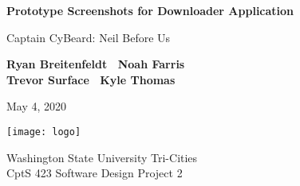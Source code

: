 \begin{titlepage}
    \begin{center}
        \vspace*{1cm}

        \Huge
        \textbf{Prototype Screenshots for Downloader Application}

        \vspace{.5cm}
        \LARGE
        Captain CyBeard: Neil Before Us

        \vspace{1cm}

        \textbf{Ryan Breitenfeldt \textbar\ Noah Farris\\ Trevor Surface \textbar\ Kyle Thomas}

        \vspace{.2cm}
        \Large
        May 4, 2020

        \vspace{2cm}
        \texttt{[image: logo]}

        \vfill

        Washington State University Tri-Cities\\
        CptS 423 Software Design Project 2

    \end{center}
\end{titlepage}

